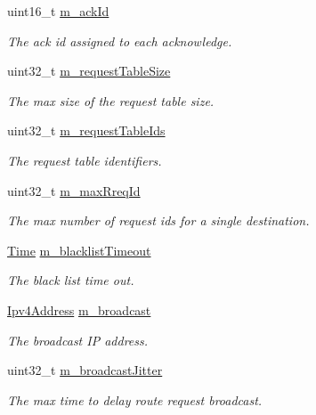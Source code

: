 \begin{DoxyCompactItemize}
uint16\+\_\+t \hyperlink{classns3_1_1dsr_1_1DsrRouting_a38c5f8c952141a9853ae9f8ee116e292}{m\+\_\+ack\+Id}
\begin{DoxyCompactList}\small\item\em The ack id assigned to each acknowledge. \end{DoxyCompactList}\item 
uint32\+\_\+t \hyperlink{classns3_1_1dsr_1_1DsrRouting_a8f6df12e2c9690f79943c2195af1be37}{m\+\_\+request\+Table\+Size}
\begin{DoxyCompactList}\small\item\em The max size of the request table size. \end{DoxyCompactList}\item 
uint32\+\_\+t \hyperlink{classns3_1_1dsr_1_1DsrRouting_aac8b18967bf0bc05a7f0024ea55e99b1}{m\+\_\+request\+Table\+Ids}
\begin{DoxyCompactList}\small\item\em The request table identifiers. \end{DoxyCompactList}\item 
uint32\+\_\+t \hyperlink{classns3_1_1dsr_1_1DsrRouting_a14ef1332178e76768359c27a45db9624}{m\+\_\+max\+Rreq\+Id}
\begin{DoxyCompactList}\small\item\em The max number of request ids for a single destination. \end{DoxyCompactList}\item 
\hyperlink{classns3_1_1Time}{Time} \hyperlink{classns3_1_1dsr_1_1DsrRouting_a07022fdee22444ddb4560c1f78bccaf2}{m\+\_\+blacklist\+Timeout}
\begin{DoxyCompactList}\small\item\em The black list time out. \end{DoxyCompactList}\item 
\hyperlink{classns3_1_1Ipv4Address}{Ipv4\+Address} \hyperlink{classns3_1_1dsr_1_1DsrRouting_a52d4ef78c13236c73c60db85c0088ff6}{m\+\_\+broadcast}
\begin{DoxyCompactList}\small\item\em The broadcast IP address. \end{DoxyCompactList}\item 
uint32\+\_\+t \hyperlink{classns3_1_1dsr_1_1DsrRouting_afb77e13fc791e5076ee1f8595b9c6617}{m\+\_\+broadcast\+Jitter}
\begin{DoxyCompactList}\small\item\em The max time to delay route request broadcast. \end{DoxyCompactList}\item 

\end{DoxyCompactItemize}
